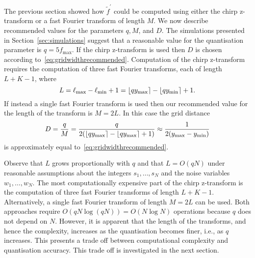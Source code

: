 \documentclass[10pt,twocolumn,twoside]{IEEEtran}
\begin{document}
The previous section showed how $\widetilde{f}^\prime$ could be computed using either the chirp z-transform or a fast Fourier transform of length $M$.  We now describe recommended values for the parameters $q, M$, and $D$.  The simulations presented in Section~\ref{sec:simulations} suggest that a reasonable value for the quantisation parameter is $q = 5 f_{\text{max}}$.  If the chirp z-transform is used then $D$ is chosen according to~\eqref{eq:gridwidthrecommended}.  Computation of the chirp z-transform requires the computation of three fast Fourier transforms, each of length $L + K - 1$, where 
\[
L = \ell_{\text{max}} - \ell_{\text{min}} + 1 = {\left\lfloor qy_{\text{max}} \right\rceil} - {\left\lfloor qy_{\text{min}} \right\rceil} + 1.
\]
If instead a single fast Fourier transform is used then our recommended value for the length of the transform is $M= 2L$.  In this case the grid distance
\[ 
D = \frac{q}{M} = \frac{q}{2({\left\lfloor qy_{\text{max}} \right\rceil} - {\left\lfloor qy_{\text{max}} \right\rceil} + 1)} \approx  \frac{1}{2(y_{\text{max}} - y_{\text{min}})}
\]
is approximately equal to~\eqref{eq:gridwidthrecommended}.  

Observe that $L$ grows proportionally with $q$ and that $L = O(qN)$ under reasonable assumptions about the integers $s_1,\dots,s_N$ and the noise variables $w_1,\dots,w_N$.  The most computationally expensive part of the chirp z-transform is the computation of three fast Fourier transforms of length $L+K-1$.  Alternatively, a single fast Fourier transform of length $M = 2L$ can be used.  Both approaches require $O(qN\log(qN)) = O(N\log N)$ operations because $q$ does not depend on $N$.  However, it is apparent that the length of the transforms, and hence the complexity, increases as the quantisation becomes finer, i.e., as $q$ increases.  This presents a trade off between computational complexity and quantisation accuracy.  This trade off is investigated in the next section.
\end{document}
